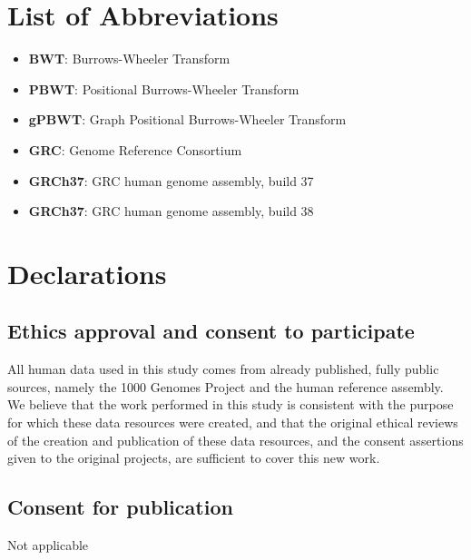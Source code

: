 \section{List of Abbreviations}
\begin{itemize}
\item \textbf{BWT}: Burrows-Wheeler Transform
\item \textbf{PBWT}: Positional Burrows-Wheeler Transform
\item \textbf{gPBWT}: Graph Positional Burrows-Wheeler Transform
\item \textbf{GRC}: Genome Reference Consortium
\item \textbf{GRCh37}: GRC human genome assembly, build 37
\item \textbf{GRCh37}: GRC human genome assembly, build 38
\end{itemize}

\section{Declarations}

\subsection{Ethics approval and consent to participate}
All human data used in this study comes from already published, fully public sources, namely the 1000 Genomes Project and the human reference assembly. We believe that the work performed in this study is consistent with the purpose for which these data resources were created, and that the original ethical reviews of the creation and publication of these data resources, and the consent assertions given to the original projects, are sufficient to cover this new work.

\subsection{Consent for publication}
Not applicable

